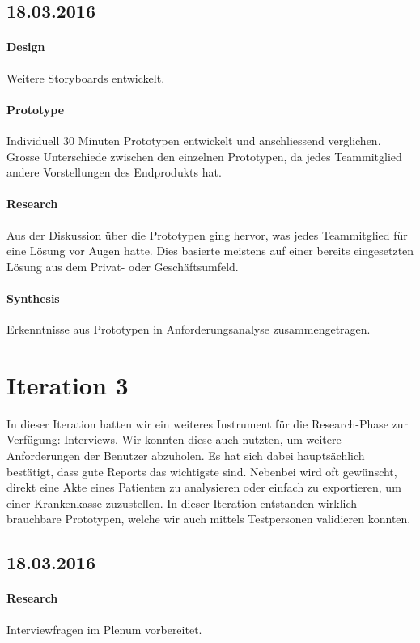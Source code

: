 \documentclass[a4paper]{scrreprt}
\begin{document}
\subsection*{18.03.2016}
\paragraph{Design}
Weitere Storyboards entwickelt.


\paragraph{Prototype}
Individuell 30 Minuten Prototypen entwickelt und anschliessend verglichen. Grosse Unterschiede zwischen den einzelnen Prototypen, da jedes Teammitglied andere Vorstellungen des Endprodukts hat.

\paragraph{Research}
Aus der Diskussion über die Prototypen ging hervor, was jedes Teammitglied für eine Lösung vor Augen hatte. Dies basierte meistens auf einer bereits eingesetzten Lösung aus dem Privat- oder Geschäftsumfeld. 

\paragraph{Synthesis}
Erkenntnisse aus Prototypen in Anforderungsanalyse zusammengetragen.



\section{Iteration 3}
In dieser Iteration hatten wir ein weiteres Instrument für die Research-Phase zur Verfügung: Interviews. Wir konnten diese auch nutzten, um weitere Anforderungen der Benutzer abzuholen. Es hat sich dabei hauptsächlich bestätigt, dass gute Reports das wichtigste sind. Nebenbei wird oft gewünscht, direkt eine Akte eines Patienten zu analysieren oder einfach zu exportieren, um einer Krankenkasse zuzustellen.
In dieser Iteration entstanden wirklich brauchbare Prototypen, welche wir auch mittels Testpersonen validieren konnten.

\subsection*{18.03.2016}

\paragraph{Research}
Interviewfragen im Plenum vorbereitet.
\end{document}
